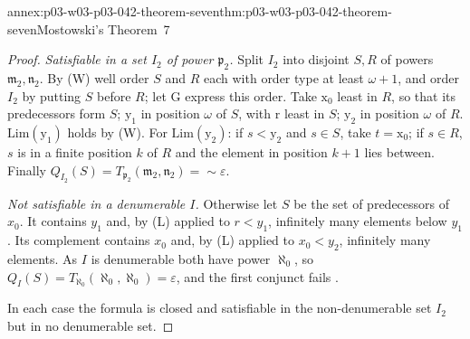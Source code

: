 \begin{annexitem}{annex:p03-w03-p03-042-theorem-seven}{thm:p03-w03-p03-042-theorem-seven}{Mostowski's Theorem~7}
\begin{proof}
\emph{Satisfiable in a set \(I_2\) of power \(\mathfrak p_2\).}  Split
\(I_2\) into disjoint \(S,R\) of powers \(\mathfrak m_2,\mathfrak n_2\).
By (W) well order \(S\) and \(R\) each with order type at least
\(\omega+1\), and order \(I_2\) by putting \(S\) before \(R\); let
\(\mathrm G\) express this order.  Take \(\mathrm x_0\) least in \(R\), so
that its predecessors form \(S\); \(\mathrm y_1\) in position \(\omega\) of
\(S\), with \(\mathrm r\) least in \(S\); \(\mathrm y_2\) in position
\(\omega\) of \(R\).  \(\mathrm{Lim}(\mathrm y_1)\) holds by (W).  For
\(\mathrm{Lim}(\mathrm y_2)\): if \(s<\mathrm y_2\) and \(s\in S\), take
\(t=\mathrm x_0\); if \(s\in R\), \(s\) is in a finite position \(k\) of
\(R\) and the element in position \(k+1\) lies between.  Finally
\(Q_{I_2}(S)=T_{\mathfrak p_2}(\mathfrak m_2,\mathfrak n_2)=
{\sim}\varepsilon\).

\emph{Not satisfiable in a denumerable \(I\).}  Otherwise let \(S\) be the
set of predecessors of \(x_0\).  It contains \(y_1\) and, by (L) applied to
\(r<y_1\), infinitely many elements below \(y_1\).  Its complement contains
\(x_0\) and, by (L) applied to \(x_0<y_2\), infinitely many elements.  As
\(I\) is denumerable both have power \(\aleph_0\), so
\(Q_I(S)=T_{\aleph_0}(\aleph_0,\aleph_0)=\varepsilon\), and the first
conjunct fails \cite[p.~25]{Mostowski1957}.

In each case the formula is closed and satisfiable in the non-denumerable
set \(I_2\) but in no denumerable set.
\end{proof}
\end{annexitem}

